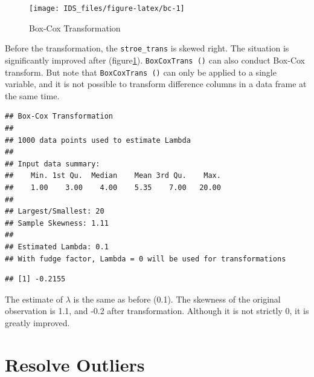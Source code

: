 \documentclass[12pt,]{krantz}
\newenvironment{Shaded}{\begin{snugshade}}{\end{snugshade}}
\newcommand{\KeywordTok}[1]{\textcolor[rgb]{0.13,0.29,0.53}{\textbf{#1}}}
\newcommand{\OperatorTok}[1]{\textcolor[rgb]{0.81,0.36,0.00}{\textbf{#1}}}
\newcommand{\NormalTok}[1]{#1}
\theoremstyle{definition}
\theoremstyle{definition}
\theoremstyle{definition}
\theoremstyle{remark}
\begin{document}
\begin{figure}

{\centering \texttt{[image: IDS\_files/figure-latex/bc-1]} 

}

\caption{Box-Cox Transformation}\label{fig:bc}
\end{figure}

Before the transformation, the \texttt{stroe\_trans} is skewed right.
The situation is significantly improved after (figure\ref{fig:bc}).
\texttt{BoxCoxTrans\ ()} can also conduct Box-Cox transform. But note
that \texttt{BoxCoxTrans\ ()} can only be applied to a single variable,
and it is not possible to transform difference columns in a data frame
at the same time.

\begin{Shaded}
\end{Shaded}

\begin{verbatim}
## Box-Cox Transformation
## 
## 1000 data points used to estimate Lambda
## 
## Input data summary:
##    Min. 1st Qu.  Median    Mean 3rd Qu.    Max. 
##    1.00    3.00    4.00    5.35    7.00   20.00 
## 
## Largest/Smallest: 20 
## Sample Skewness: 1.11 
## 
## Estimated Lambda: 0.1 
## With fudge factor, Lambda = 0 will be used for transformations
\end{verbatim}

\begin{Shaded}
\end{Shaded}

\begin{verbatim}
## [1] -0.2155
\end{verbatim}

The estimate of \(\lambda\) is the same as before (0.1). The skewness of
the original observation is 1.1, and -0.2 after transformation. Although
it is not strictly 0, it is greatly improved.

\section{Resolve Outliers}\label{resolve-outliers}
\end{document}
